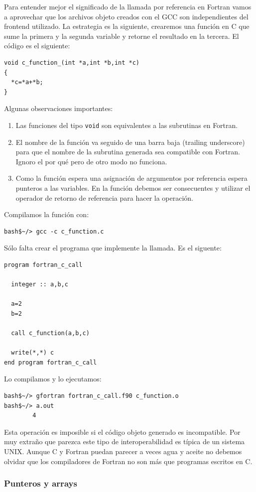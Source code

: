 Para entender mejor el significado de la llamada por referencia en
Fortran vamos a aprovechar que los archivos objeto creados con el GCC
son independientes del frontend utilizado.  La estrategia es la
siguiente, crearemos una función en C que sume la primera y la segunda
variable y retorne el resultado en la tercera.  El código es el
siguiente:
\begin{verbatim}
void c_function_(int *a,int *b,int *c)
{
  *c=*a+*b;
}
\end{verbatim}
Algunas observaciones importantes:
\begin{enumerate}
\item Las funciones del tipo \texttt{void} son equivalentes a las
  subrutinas en Fortran.
\item El nombre de la función va seguido de una barra baja (trailing
  underscore) para que el nombre de la subrutina generada sea
  compatible con Fortran.  Ignoro el por qué pero de otro modo no
  funciona.
\item Como la función espera una asignación de argumentos por
  referencia espera punteros a las variables.  En la función debemos
  ser consecuentes y utilizar el operador de retorno de referencia
  para hacer la operación.
\end{enumerate}
Compilamos la función con:
\begin{verbatim}
bash$~/> gcc -c c_function.c
\end{verbatim}

Sólo falta crear el programa que implemente la llamada.  Es el
siguente:
\begin{verbatim}
program fortran_c_call

  integer :: a,b,c

  a=2
  b=2

  call c_function(a,b,c)

  write(*,*) c
end program fortran_c_call
\end{verbatim}
Lo compilamos y lo ejecutamos:
\begin{verbatim}
bash$~/> gfortran fortran_c_call.f90 c_function.o
bash$~/> a.out
        4
\end{verbatim}
Esta operación es imposible si el código objeto generado es
incompatible. Por muy extraño que parezca este tipo de
interoperabilidad es típica de un sistema UNIX.  Aunque C y Fortran
puedan parecer a veces agua y aceite no debemos olvidar que los
compiladores de Fortran no son más que programas escritos en C.

\subsubsection{Punteros y arrays}

